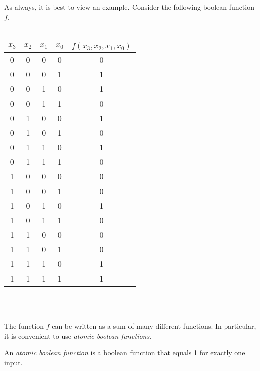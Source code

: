 \par As always, it is best to view an example. Consider the following boolean function
$f$.
\\
\\
\begin{tabular}{|c|c|c|c|c|}
  \hline
  $x_3$&$x_2$&$x_1$&$x_0$&$f(x_3,x_2,x_1,x_0)$\\
  \hline
  0&0&0&0&0\\
  0&0&0&1&1\\
  0&0&1&0&1\\
  0&0&1&1&0\\
  0&1&0&0&1\\
  0&1&0&1&0\\
  0&1&1&0&1\\
  0&1&1&1&0\\
  1&0&0&0&0\\
  1&0&0&1&0\\
  1&0&1&0&1\\
  1&0&1&1&0\\
  1&1&0&0&0\\
  1&1&0&1&0\\
  1&1&1&0&1\\
  1&1&1&1&1\\
  \hline
\end{tabular}
\\
\\
\par The function $f$ can be written as a sum of many different functions.
In particular, it is convenient to use {\em atomic boolean functions}.

\begin{definition}
  An {\em atomic boolean function} is a boolean function that equals 1 for exactly
  one input.
\end{definition}


